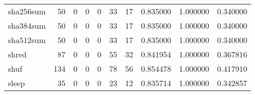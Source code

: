 \begin{tabular}{lrrrrrrrrr}
sha256sum &                                        50 &                                                  0 &                                                  0 &                                                  0 &                                                 33 &                                                 17 &                                           0.835000 &                               1.000000 &                             0.340000 \\
sha384sum &                                        50 &                                                  0 &                                                  0 &                                                  0 &                                                 33 &                                                 17 &                                           0.835000 &                               1.000000 &                             0.340000 \\
sha512sum &                                        50 &                                                  0 &                                                  0 &                                                  0 &                                                 33 &                                                 17 &                                           0.835000 &                               1.000000 &                             0.340000 \\
shred     &                                        87 &                                                  0 &                                                  0 &                                                  0 &                                                 55 &                                                 32 &                                           0.841954 &                               1.000000 &                             0.367816 \\
shuf      &                                       134 &                                                  0 &                                                  0 &                                                  0 &                                                 78 &                                                 56 &                                           0.854478 &                               1.000000 &                             0.417910 \\
sleep     &                                        35 &                                                  0 &                                                  0 &                                                  0 &                                                 23 &                                                 12 &                                           0.835714 &                               1.000000 &                             0.342857 \\

\end{tabular}
